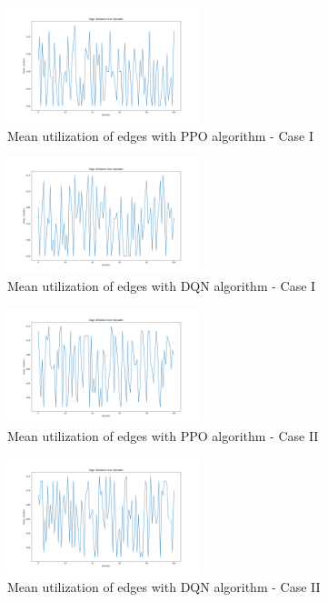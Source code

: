 \documentclass[conference]{IEEEtran}
\begin{document}
\begin{figure}[ht]
  \centering
   \includegraphics[width=0.5\textwidth]{util_ppo1.png}
  \caption{Mean utilization of edges with PPO algorithm - Case I}
  \label{fig:util_ppo1}
\end{figure}

\begin{figure}[ht]
  \centering
   \includegraphics[width=0.5\textwidth]{util_dqn1.png}
  \caption{Mean utilization of edges with DQN algorithm - Case I}
  \label{fig:util_dqn1}
\end{figure}

\begin{figure}[ht]
  \centering
   \includegraphics[width=0.5\textwidth]{util_ppo.png}
  \caption{Mean utilization of edges with PPO algorithm - Case II}
  \label{fig:util_ppo}
\end{figure}

\begin{figure}[ht]
  \centering
   \includegraphics[width=0.5\textwidth]{util_dqn.png}
  \caption{Mean utilization of edges with DQN algorithm - Case II}
  \label{fig:util_dqn}
\end{figure}
\end{document}
